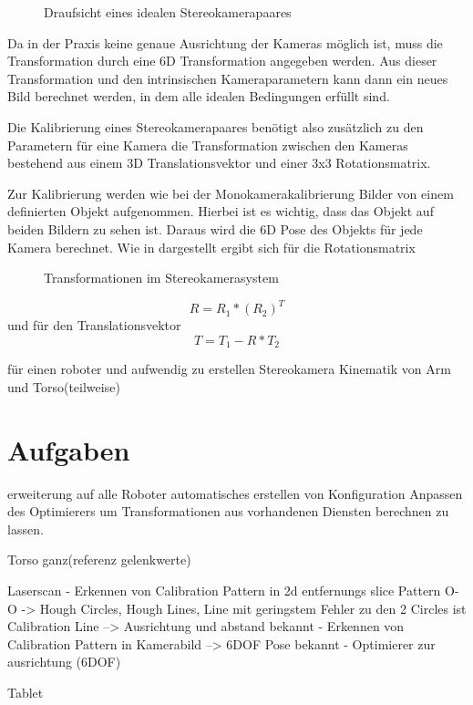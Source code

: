 \begin{figure}[htpb]
  \centering
    \def\svgwidth{\textwidth}
  
  \caption{Draufsicht eines idealen Stereokamerapaares}
  \label{fig:DraufStereo}
\end{figure}

Da in der Praxis keine genaue Ausrichtung der Kameras möglich ist, muss die Transformation 
durch eine 6D Transformation angegeben werden. Aus dieser Transformation und den intrinsischen 
Kameraparametern kann dann ein neues Bild berechnet werden, in dem alle idealen 
Bedingungen erfüllt sind.

Die Kalibrierung eines Stereokamerapaares benötigt also zusätzlich zu den Parametern
für eine Kamera die Transformation zwischen den Kameras bestehend aus einem 3D 
Translationsvektor und einer 3x3 Rotationsmatrix.

Zur Kalibrierung werden wie bei der Monokamerakalibrierung Bilder von einem definierten 
Objekt aufgenommen. Hierbei ist es wichtig, dass das Objekt auf beiden Bildern zu sehen ist.
Daraus wird die 6D Pose des Objekts für jede Kamera berechnet. Wie in 
dargestellt ergibt sich für die Rotationsmatrix

\begin{figure}[htpb]
  \centering
    \def\svgwidth{\textwidth}
  
  \caption{Transformationen im Stereokamerasystem}
  \label{fig:StereoTrans}
\end{figure}


\begin{equation}
	R=R_1*(R_2)^T
\end{equation}
und für den Translationsvektor
\begin{equation}
	T=T_1-R*T_2
\end{equation}


für einen roboter und aufwendig zu erstellen Stereokamera Kinematik von Arm und
Torso(teilweise)

\section{Aufgaben} erweiterung auf alle Roboter automatisches erstellen von
Konfiguration Anpassen des Optimierers um Transformationen aus vorhandenen
Diensten berechnen zu lassen.


Torso ganz(referenz gelenkwerte)

Laserscan - Erkennen von Calibration Pattern in 2d entfernungs slice Pattern
O-O -> Hough Circles, Hough Lines, Line mit geringstem Fehler zu den 2 Circles
ist Calibration Line --> Ausrichtung und abstand bekannt - Erkennen von
Calibration Pattern in Kamerabild --> 6DOF Pose bekannt - Optimierer zur
ausrichtung (6DOF)




Tablet

%
